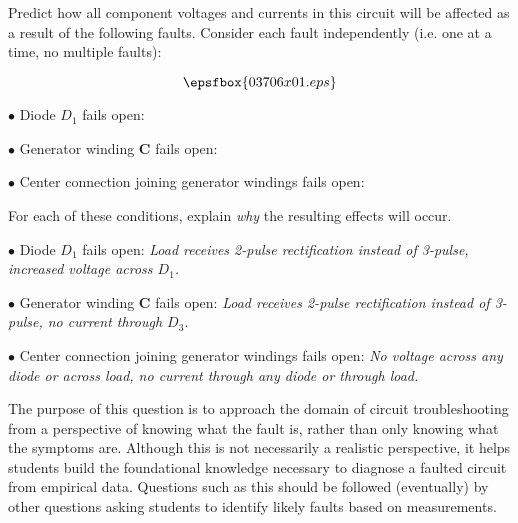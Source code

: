 

Predict how all component voltages and currents in this circuit will be affected as a result of the following faults.  Consider each fault independently (i.e. one at a time, no multiple faults):

$$\epsfbox{03706x01.eps}$$

\medskip
\item{$\bullet$} Diode $D_1$ fails open:
\vskip 5pt
\item{$\bullet$} Generator winding {\bf C} fails open:
\vskip 5pt
\item{$\bullet$} Center connection joining generator windings fails open:
\medskip

For each of these conditions, explain {\it why} the resulting effects will occur.







\medskip
\item{$\bullet$} Diode $D_1$ fails open: {\it Load receives 2-pulse rectification instead of 3-pulse, increased voltage across $D_1$.}
\vskip 5pt
\item{$\bullet$} Generator winding {\bf C} fails open: {\it Load receives 2-pulse rectification instead of 3-pulse, no current through $D_3$.}
\vskip 5pt
\item{$\bullet$} Center connection joining generator windings fails open: {\it No voltage across any diode or across load, no current through any diode or through load.}
\medskip







The purpose of this question is to approach the domain of circuit troubleshooting from a perspective of knowing what the fault is, rather than only knowing what the symptoms are.  Although this is not necessarily a realistic perspective, it helps students build the foundational knowledge necessary to diagnose a faulted circuit from empirical data.  Questions such as this should be followed (eventually) by other questions asking students to identify likely faults based on measurements.




